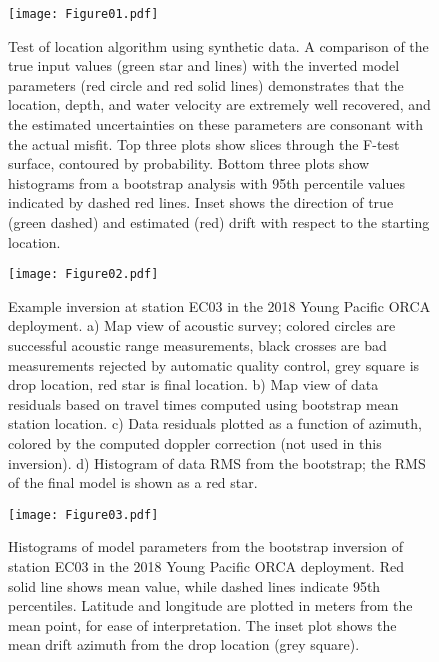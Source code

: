 \begin{figure}[h]
\texttt{[image: Figure01.pdf]}
\caption{Test of location algorithm using synthetic data. A comparison of the true input values (green star and lines) with the inverted model parameters (red circle and red solid lines) demonstrates that the location, depth, and water velocity are extremely well recovered, and the estimated uncertainties on these parameters are consonant with the actual misfit. Top three plots show slices through the F-test surface, contoured by probability. Bottom three plots show histograms from a bootstrap analysis with 95th percentile values indicated by dashed red lines. Inset shows the direction of true (green dashed) and estimated (red) drift with respect to the starting location. }
\label{fig:one_sta_synth}
\end{figure}

\begin{figure}[h]
\texttt{[image: Figure02.pdf]}
\caption{Example inversion at station EC03 in the 2018 Young Pacific ORCA deployment. a) Map view of acoustic survey; colored circles are successful acoustic range measurements, black crosses are bad measurements rejected by automatic quality control, grey square is drop location, red star is final location. b) Map view of data residuals based on travel times computed using bootstrap mean station location. c) Data residuals plotted as a function of azimuth, colored by the computed doppler correction (not used in this inversion). d) Histogram of data RMS from the bootstrap; the RMS of the final model is shown as a red star.}
\label{fig:one_sta_real_survey}
\end{figure}

\begin{figure}[h]
\texttt{[image: Figure03.pdf]}
\caption{Histograms of model parameters from the bootstrap inversion of station EC03 in the 2018 Young Pacific ORCA deployment. Red solid line shows mean value, while dashed lines indicate 95th percentiles. Latitude and longitude are plotted in meters from the mean point, for ease of interpretation. The inset plot shows the mean drift azimuth from the drop location (grey square).}
\label{fig:one_sta_real_histograms}
\end{figure}

